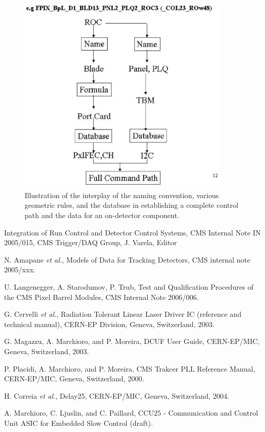 \documentclass{cmspaper}
\begin{document}
\begin{figure}
\begin{center}   
\includegraphics[width =0.9\textwidth]{association_eg.eps}   
\caption{Illustration of the interplay of the naming convention, various
geometric rules, and the database in establishing a complete control
path and the data for an on-detector component.     
\label{figure:associations} }
\end{center}
\end{figure}


\begin{thebibliography}{9}

 Integration of Run Control and Detector Control Systems,
CMS Internal Note IN 2005/015, CMS Trigger/DAQ Group, J. Varela, Editor

 N. Amapane {\it et al.}, Models of Data for Tracking 
Detectors, CMS internal note 2005/xxx.

 U. Langenegger, A. Starodumov, P. Trub, Test and 
Qualification Procedures of the CMS Pixel Barrel Modules, CMS Internal
Note 2006/006.

   G. Cervelli {\it et al.}, Radiation Tolerant Linear Laser 
Driver IC (reference and technical manual), CERN-EP Division, Geneva, 
Switzerland, 2003.
  
   G. Magazzu, A. Marchioro, and P. Moreira, DCUF User Guide, 
CERN-EP/MIC, Geneva, Switzerland, 2003.


   P. Placidi, A. Marchioro, and P. Moreira, CMS Trakcer PLL 
Reference Manual, CERN-EP/MIC, Geneva, Switzerland, 2000.

   H. Correia {\it et al.}, Delay25, CERN-EP/MIC, Geneva, 
Switzerland, 2004.

 A. Marchioro, C. Ljuslin, and C. Paillard, CCU25 - Communication and Control Unit ASIC for Embedded Slow Control (draft). 
\end{thebibliography}
 
\end{document}
